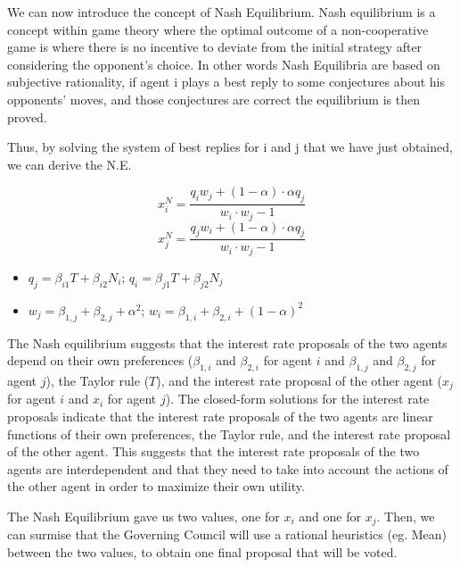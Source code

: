 \documentclass[12pt]{article}
\begin{document}
We can now introduce the concept of Nash Equilibrium. Nash equilibrium is a concept within game theory where the optimal outcome of a non-cooperative game is where there is no incentive to deviate from the initial strategy after considering the opponent's choice. 
In other words Nash Equilibria are based on subjective rationality, if agent i plays a best reply to some conjectures about his opponents' moves, and those conjectures are correct the equilibrium is then proved.

Thus, by solving the system of best replies for i and j that we have just obtained, we can derive the N.E. 

\[x_i^N = \frac{ q_i w_j + (1 - \alpha)\cdot\alpha q_j} {w_i \cdot w_j - 1}\]
\[x_j^N = \frac{ q_j w_i + (1 - \alpha)\cdot\alpha q_j} {w_i \cdot w_j - 1}\]
\begin{itemize}
    \item \(q_j = \beta_{i1} T + \beta_{i2} N_i\); \(q_i = \beta_{j1} T + \beta_{j2} N_j\)
    \item \(w_j = \beta_{1,j} + \beta_{2,j} + \alpha^2\); \(w_i = \beta_{1,i} + \beta_{2,i} + (1 - \alpha)^2\)
\end{itemize}


The Nash equilibrium suggests that the interest rate proposals of the two agents depend on their own preferences
($\beta_{1,i}$ and $\beta_{2,i}$ for agent $i$ and $\beta_{1,j}$ and $\beta_{2,j}$ for agent $j$), the Taylor rule
($T$), and the interest rate proposal of the other agent ($x_j$ for agent $i$ and $x_i$ for agent $j$).
\vspace{8pt}
The closed-form solutions for the interest rate proposals indicate that the interest rate proposals of the two agents
are linear functions of their own preferences, the Taylor rule, and the interest rate proposal of the other agent. This
suggests that the interest rate proposals of the two agents are interdependent and that they need to take into account
the actions of the other agent in order to maximize their own utility.

\vspace{8pt}
The Nash Equilibrium gave us two values, one for $x_i$ and one for $x_j$. Then, we can surmise that the Governing Council 
will use a rational heuristics (eg. Mean) between the two values, to obtain one final proposal that will be voted. 
\end{document}
